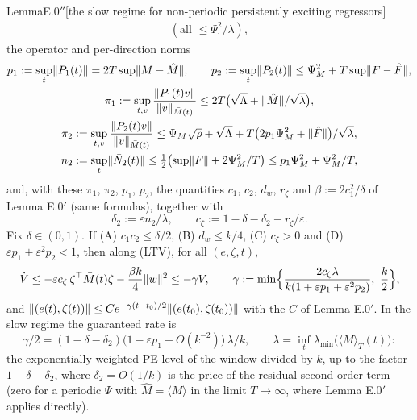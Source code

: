\begin{thm}{Lemma}{E.0$''$}[the slow regime for non-periodic persistently exciting regressors]
\begin{gather*}
  (\text{all }\le\Psi_\cdot^2/\lambda),
\end{gather*}
the operator and per-direction norms
\begin{gather*}
  p_1:=\sup_t\lVert P_1(t)\rVert=2T\sup\lVert \bar M-\hat M\rVert,\qquad
  p_2:=\sup_t\lVert P_2(t)\rVert\le\Psi_M^2+T\sup\lVert \bar F-\hat F\rVert,\\
  \pi_1:=\sup_{t,v}\frac{\lVert P_1(t)v\rVert}{\lVert v\rVert_{\bar M(t)}}\le2T\bigl(\sqrt\Lambda+\lVert \hat M\rVert/\sqrt\lambda\bigr),\\
  \pi_2:=\sup_{t,v}\frac{\lVert P_2(t)v\rVert}{\lVert v\rVert_{\bar M(t)}}
  \le\Psi_M\sqrt\rho+\sqrt\Lambda+T\bigl(2p_1\Psi_M^2+\lVert \hat F\rVert\bigr)/\sqrt\lambda,\\
  n_2:=\sup_t\lVert \bar N_2(t)\rVert\le\tfrac12\bigl(\sup\lVert F\rVert+2\Psi_M^2/T\bigr)\le p_1\Psi_M^2+\Psi_M^2/T,
\end{gather*}
and, with these $\pi_1$, $\pi_2$, $p_1$, $p_2$, the quantities $c_1$, $c_2$, $d_w$, $r_\zeta$ and
$\beta:=2c_1^2/\delta$ of Lemma E.0$'$ (same formulas), together with
\[
  \delta_2:=\varepsilon n_2/\lambda,\qquad c_\zeta:=1-\delta-\delta_2-r_\zeta/\varepsilon.
\]
Fix $\delta\in(0,1)$. If \textup{(A)} $c_1c_2\le\delta/2$, \textup{(B)} $d_w\le k/4$, \textup{(C)} $c_\zeta>0$ and
\textup{(D)} $\varepsilon p_1+\varepsilon^2p_2<1$, then along \textup{(LTV)}, for all $(e,\zeta,t)$,
\[
  \dot V\le-\varepsilon c_\zeta\,\zeta^\top\bar M(t)\zeta-\frac{\beta k}4\lVert w\rVert^2\le-\gamma V,\qquad
  \gamma:=\min\Bigl\{\frac{2c_\zeta\lambda}{k(1+\varepsilon p_1+\varepsilon^2p_2)},\ \frac k2\Bigr\},
\]
and $\lVert (e(t),\zeta(t))\rVert\le Ce^{-\gamma(t-t_0)/2}\lVert (e(t_0),\zeta(t_0))\rVert$ with the $C$ of Lemma E.0$'$. In the
slow regime the guaranteed rate is
\[
  \gamma/2=(1-\delta-\delta_2)\bigl(1-\varepsilon p_1+O(k^{-2})\bigr)\,\lambda/k,\qquad
  \lambda=\inf_t\lambda_{\min}\bigl(\langle M\rangle_T(t)\bigr):
\]
the exponentially weighted PE level of the window divided by $k$, up to the factor $1-\delta-\delta_2$, where
$\delta_2=O(1/k)$ is the price of the residual second-order term (zero for a periodic $\Psi$ with
$\hat M=\langle M\rangle$ in the limit $T\to\infty$, where Lemma E.0$'$ applies directly).
\end{thm}
